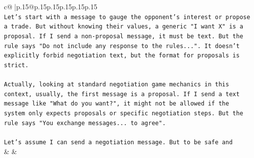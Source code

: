 \documentclass{article}
\begin{document}
{\begin{supertabular}{c@{$\;$}|p{.15\linewidth}@{}p{.15\linewidth}p{.15\linewidth}p{.15\linewidth}p{.15\linewidth}p{.15\linewidth}}
{{{\\ 
\texttt{Let's start with a message to gauge the opponent's interest or propose a trade. But without knowing their values, a generic "I want X" is a proposal. If I send a non{-}proposal message, it must be text. But the rule says "Do not include any response to the rules...". It doesn't explicitly forbid negotiation text, but the format for proposals is strict.} \\
\\ 
\texttt{Actually, looking at standard negotiation game mechanics in this context, usually, the first message is a proposal. If I send a text message like "What do you want?", it might not be allowed if the system only expects proposals or specific negotiation steps. But the rule says "You exchange messages... to agree".} \\
\\ 
\texttt{Let's assume I can send a negotiation message. But to be safe and} \\
            }
        }
    }
    & & \\ \\


\end{supertabular}}
\end{document}
